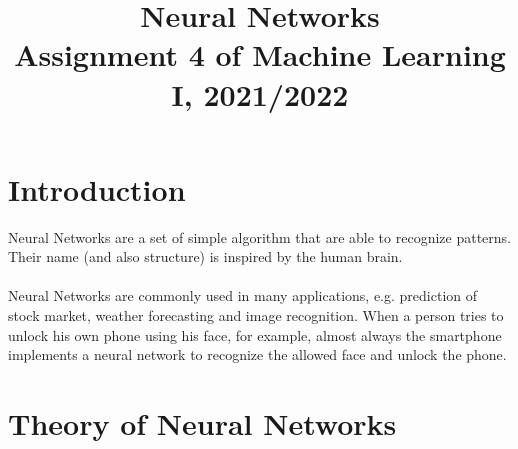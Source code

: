 \documentclass[10pt]{article}
\begin{document}
\noindent



\title{Neural Networks\\Assignment 4 of Machine Learning I, 2021/2022}




\maketitle



\section{Introduction}
Neural Networks are a set of simple algorithm that
are able to recognize patterns. Their name (and also structure) is inspired by the human brain.
\\\\
Neural Networks are commonly used in many applications,
e.g. prediction of stock market, weather forecasting and image
recognition. When a person tries to unlock his own phone
using his face, for example, almost always the smartphone
implements a neural network to recognize the allowed face
and unlock the phone.

\section{Theory of Neural Networks}
\end{document}
